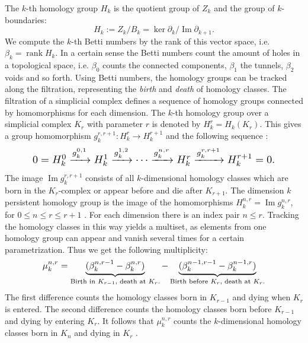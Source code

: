 \documentclass{article}
\DeclareMathOperator{\Ima}{\text{Im}}
\DeclareMathOperator{\rank}{\text{rank}}
\begin{document}
The $k$-th homology group $H_k$ is the quotient group of $Z_k$ and the group of $k$-boundaries:
\begin{equation}
  H_k := Z_k / B_k = \ker \partial_k / \Ima \partial_{k+1}.
\end{equation}
We compute the $k$-th Betti numbers by the rank of this vector space, i.e. $\beta_k = \rank H_k$. In a certain sense the Betti numbers count the amount of holes in a topological space, i.e. $\beta_0$ counts the connected components, $\beta_1$ the tunnels, $\beta_2$ voids and so forth. Using Betti numbers, the homology groups can be tracked along the filtration, representing the \textit{birth} and \textit{death} of homology classes. The filtration of a simplicial complex defines a sequence of homology groups connected by homomorphisms for each dimension. The $k$-th homology group over a simplicial complex $K_r$ with parameter $r$ is denoted by $H_k^r = H_k(K_r)$. This gives a group homomorphism $g^{r,r+1}_k: H_k^r \rightarrow H_k^{r+1}$ and the following sequence \cite{edelsbrunner2008persistent}:
\begin{equation}
\resizebox{0.85\columnwidth}{!}
{$0 = H_k^0 \xrightarrow{g^{0,1}_k} H_k^1 \xrightarrow{g^{1,2}_k} \cdots \xrightarrow{g^{n,r}_k} H_k^r \xrightarrow{g^{r,r+1}_k} H_k^{r+1} = 0.$}
\end{equation}
The image $\Ima g^{r,r+1}_k$ consists of all $k$-dimensional homology classes which are born in the $K_r$-complex or appear before and die after $K_{r+1}$. The dimension $k$ persistent homology group is the image of the homomorphisms $H_k^{n,r} = \Ima g_k^{n,r}$, for $0\leq n \leq r \leq r+1$ \cite{edelsbrunner2008persistent}. For each dimension there is an index pair $n \leq r$. Tracking the homology classes in this way yields a multiset, as elements from one homology group can appear and vanish several times for a certain parametrization. Thus we get the following multiplicity:
\begin{equation}
\resizebox{0.8\columnwidth}{!}
{
$\mu^{n,r}_k = \underbrace{(\beta_k^{n,r-1} - \beta_k^{n,r})}_{\text{Birth in $K_{r-1}$, death at $K_r$.}} - \underbrace{(\beta_k^{n-1,r-1}-\beta_k^{n-1,r})}_{\text{Birth before $K_r$, death at $K_r$.}}$
}
\end{equation}
The first difference counts the homology classes born in $K_{r-1}$ and dying when $K_r$ is entered. The second difference counts the homology classes born before $K_{r-1}$ and dying by entering $K_r$. It follows that $\mu^{n,r}_k$ counts the $k$-dimensional homology classes born in $K_n$ and dying in $K_r$ \cite{edelsbrunner2008persistent}.
\end{document}
